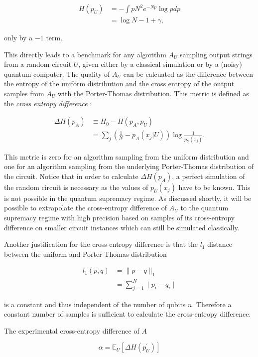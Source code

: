 \begin{align}
  H(p_U) &= - \int p N^2e^{-Np}\log{p} dp \\
         &= \log{N} -1 + \gamma,
\end{align}

only by a $-1$ term. 

This directly leads to a benchmark for any algorithm $A_U$ sampling output strings from a
random circuit $U$, given either by a
classical simulation or by a (noisy) quantum computer. The quality of 
$A_U$ can be calcuated as the difference between
the entropy of the uniform distribution and the cross entropy of the output
samples from $A_U$ with the Porter-Thomas distribution. This metric is
defined as the \textit{cross entropy difference} \cite{Boixo2018supremacy}:

\begin{align}
  \Delta H(p_A) &\equiv H_0 - H(p_A, p_U) \\
                 &=\sum_j (\frac{1}{N} - p_A(x_j|U))\log{\frac{1}{p_U(x_j)}}.
\end{align}

This metric is zero for an algorithm sampling from the uniform
distribution and one for an algorithm sampling from the underlying Porter-Thomas
distribution of the circuit.
Notice that in order to calculate $\Delta H(p_A)$, 
a perfect simulation of the random circuit is necessary as the values of $p_U(x_j)$ have to be known. This is not possible in the quantum
supremacy regime. As discussed shortly, it will be possible
to extrapolate the cross-entropy difference of $A_U$ to the quantum supremacy regime with high
precision based on samples of its cross-entropy difference on smaller circuit
instances which can still be simulated classically.

Another justification for the cross-entropy difference is that the $l_1$ distance between the uniform and Porter Thomas distribution

\begin{align}
  l_1(p,q) &= \| p-q\|_1 \\
           &= \sum_{j=1}^N \mid p_i - q_i \mid
\end{align}

is a constant and thus independent of the number of qubits $n$. Therefore a
constant number of samples is sufficient to calculate the cross-entropy
difference.

The experimental cross-entropy difference of $A$

\begin{equation}
  \alpha = \mathbb{E}_U[\Delta H(p^{\prime}_U)]
\end{equation}

